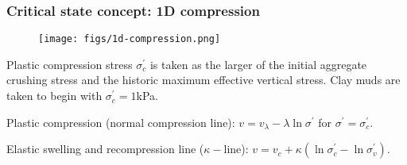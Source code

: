 \documentclass[notes]{beamer}
\begin{document}
\begin{frame}
\frametitle{Critical state concept: 1D compression}
\begin{figure}
	\texttt{[image: figs/1d-compression.png]}
\end{figure}
Plastic compression stress $\sigma_c^\prime$ is taken as the larger of the initial aggregate crushing stress and the historic maximum effective vertical stress. Clay muds are taken to begin with $\sigma_c^\prime = 1$kPa.

Plastic compression (normal compression line): $v = v_\lambda - \lambda \ln \sigma^\prime$ for $\sigma^\prime = \sigma^\prime_c$.

Elastic swelling and recompression line ($\kappa-$line): $ v = v_c + \kappa (\ln \sigma_c^\prime - \ln \sigma_v^\prime)$. 
\end{frame}
\end{document}
